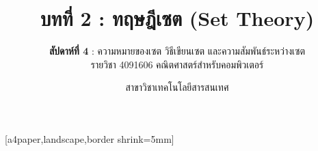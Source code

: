 \def\HANDOUTMODE{}

\usepackage{pgfpages}
[a4paper,landscape,border shrink=5mm]
\renewcommand{\footchaptertitle}{บทที่ 2 ทฤษฎีเซต (สัปดาห์ที่ 4) — Handout}

\title{\textbf{บทที่ 2 : ทฤษฎีเซต (Set Theory)}}
\subtitle{\textbf{สัปดาห์ที่ 4} : ความหมายของเซต วิธีเขียนเซต และความสัมพันธ์ระหว่างเซต \\ รายวิชา 4091606 คณิตศาสตร์สำหรับคอมพิวเตอร์}
\author{สาขาวิชาเทคโนโลยีสารสนเทศ}
\date{}




